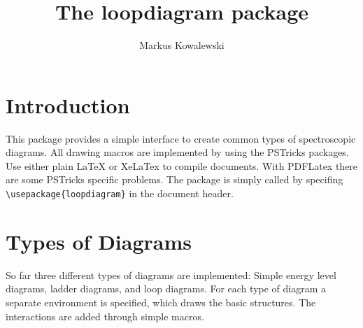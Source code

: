 \documentclass[12pt,letterpaper]{article}
\title{The loopdiagram package}
\author{Markus Kowalewski}
\begin{document}
\maketitle

\section{Introduction}
This package provides a simple interface to create common types of spectroscopic
diagrams. All drawing macros are implemented by using the PSTricks packages.
Use either plain LaTeX or XeLaTex to compile documents. With PDFLatex there are
some PSTricks specific problems. The package is simply called by specifing
\verb|\usepackage{loopdiagram}| in the document header.
 \result
\section{Types of Diagrams}
So far three different types of diagrams are implemented: Simple energy level
diagrams, ladder diagrams, and loop diagrams. For each type of diagram a separate
environment is specified, which draws the basic structures. The interactions are
added through simple macros.
\end{document}
